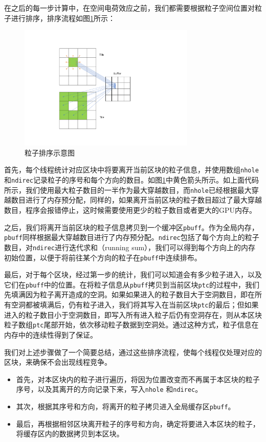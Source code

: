 在之后的每一步计算中，在空间电荷效应之前，我们都需要根据粒子空间位置对粒子进行排序，排序流程如图\ref{fig:PIC_reorder}所示：
\begin{figure}[!htb]
    \centering
    \includegraphics[width=0.75\textwidth]{Img/3PIC_reorder.pdf}
    \caption{粒子排序示意图}
    \label{fig:PIC_reorder}
\end{figure}

首先，每个线程统计对应区块中将要离开当前区块的粒子信息，并使用数组\verb"nhole"和\verb"ndirec"记录粒子的序号和每个方向的数目。如图\ref{fig:PIC_reorder}中黄色箭头所示。如上面代码所示，我们使用最大粒子数目的一半作为最大穿越数目，而\verb"nhole"已经根据最大穿越数目进行了内存预分配，同样的，如果离开当前区块的粒子数目超过了最大穿越数目，程序会报错停止，这时候需要使用更少的粒子数目或者更大的GPU内存。

之后，我们将离开当前区块的粒子信息拷贝到一个缓冲区\verb"pbuff"。作为全局内存，\verb"pbuff"同样根据最大穿越数目进行了内存预分配。\verb"ndirec"包括了每个方向上的粒子数目，对\verb"ndirec"进行迭代求和（running sum），我们可以得到每个方向上的内存初始位置，以便于将前往某个方向的粒子在\verb"pbuff"中连续排布。

最后，对于每个区块，经过第一步的统计，我们可以知道会有多少粒子进入，以及它们在\verb"pbuff"中的位置。在将粒子信息从\verb"pbuff"拷贝到当前区块\verb"ptc"的过程中，我们先填满因为粒子离开造成的空洞。如果如果进入的粒子数目大于空洞数目，即在所有空洞都被填满后，仍有粒子进入，我们将其写入在当前区块\verb"ptc"的最后；但如果进入的粒子数目小于空洞数目，即写入所有进入粒子后仍有空洞存在，则从本区块粒子数组\verb"ptc"尾部开始，依次移动粒子数据到空洞处。通过这种方式，粒子信息在内存中的连续性得到了保证。

我们对上述步骤做了一个简要总结，通过这些排序流程，使每个线程仅处理对应的区块，来确保不会出现线程竞争。

\begin{itemize}
  \item 首先，对本区块内的粒子进行遍历，将因为位置改变而不再属于本区块的粒子序号，以及其离开的方向记录下来，写入\verb"nhole" 和\verb"ndirec"。
  \item 其次，根据其序号和方向，将离开的粒子拷贝进入全局缓存区\verb"pbuff"。
  \item 最后，再根据相邻区块离开粒子的序号和方向，确定将要进入本区块的粒子，将缓存区内的数据拷贝到本区块。
\end{itemize}


